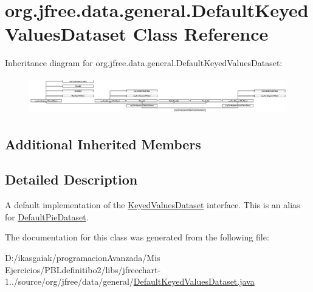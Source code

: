 \hypertarget{classorg_1_1jfree_1_1data_1_1general_1_1_default_keyed_values_dataset}{}\section{org.\+jfree.\+data.\+general.\+Default\+Keyed\+Values\+Dataset Class Reference}
\label{classorg_1_1jfree_1_1data_1_1general_1_1_default_keyed_values_dataset}
Inheritance diagram for org.\+jfree.\+data.\+general.\+Default\+Keyed\+Values\+Dataset\+:\begin{figure}[H]
\begin{center}
\leavevmode
\includegraphics[height=1.606557cm]{classorg_1_1jfree_1_1data_1_1general_1_1_default_keyed_values_dataset}
\end{center}
\end{figure}
\subsection*{Additional Inherited Members}


\subsection{Detailed Description}
A default implementation of the \mbox{\hyperlink{interfaceorg_1_1jfree_1_1data_1_1general_1_1_keyed_values_dataset}{Keyed\+Values\+Dataset}} interface. This is an alias for \mbox{\hyperlink{classorg_1_1jfree_1_1data_1_1general_1_1_default_pie_dataset}{Default\+Pie\+Dataset}}. 

The documentation for this class was generated from the following file\+:\begin{DoxyCompactItemize}
\item 
D\+:/ikasgaiak/programacion\+Avanzada/\+Mis Ejercicios/\+P\+B\+Ldefinitibo2/libs/jfreechart-\/1../source/org/jfree/data/general/\mbox{\hyperlink{_default_keyed_values_dataset_8java}{Default\+Keyed\+Values\+Dataset.\+java}}\end{DoxyCompactItemize}
